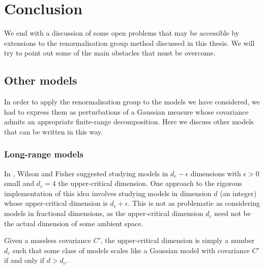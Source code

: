 \chapter{Conclusion}
\label{sec:conclusion}

\setcounter{footnote}{0}

We end with a discussion of some open problems that may be accessible by
extensions to the renormalisation group method discussed in this thesis.
We will try to point out some of the main obstacles that must be overcome.


\section{Other models}

In order to apply the renormalisation group to the models we have considered,
we had to express them as perturbations of a Gaussian measure whose covariance
admits an appropriate finite-range decomposition. Here we discuss other models
that can be written in this way.


\subsection{Long-range models}

In \cite{WF72}, Wilson and Fisher suggested studying models in $d_c - \epsilon$
dimensions with $\epsilon > 0$ small and $d_c = 4$ the upper-critical dimension.
One approach to the rigorous implementation of this idea
involves studying models in dimension $d$ (an integer) whose upper-critical
dimension is $d_c + \epsilon$. This is not as problematic as considering
models in fractional dimensions, as the upper-critical dimension $d_c$ need not
be the actual dimension of some ambient space.

Given a massless covariance $C'$, the upper-critical
dimension is simply a number $d_c$ such that some class of models scales like a
Gaussian model with covariance $C'$ if and only if $d > d_c$.

